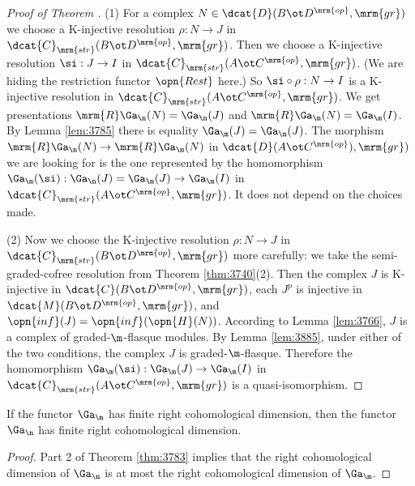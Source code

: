 \begin{proof}[Proof of Theorem \tup{\ref{thm:3783}}] \mbox{}

\smallskip \noindent
(1) For a complex 
$N \in \dcat{D}(B \ot D^{\mrm{op}}, \mrm{gr})$
we choose a K-injective resolution $\rho : N \to J$ in 
$\dcat{C}_{\mrm{str}}(B \ot D^{\mrm{op}}, \mrm{gr})$.
Then we choose a  K-injective resolution $\si : J \to I$ in 
$\dcat{C}_{\mrm{str}}(A \ot C^{\mrm{op}}, \mrm{gr})$. (We are hiding the 
restriction functor $\opn{Rest}$ here.) So 
$\si \circ \rho : N \to I$ is a K-injective resolution 
in $\dcat{C}_{\mrm{str}}(A \ot C^{\mrm{op}}, \mrm{gr})$.
We get presentations 
$\mrm{R} \Ga_{\n}(N) = \Ga_{\n}(J)$ and 
$\mrm{R} \Ga_{\m}(N) = \Ga_{\m}(I)$. 
By Lemma \ref{lem:3785} there is equality 
$\Ga_{\m}(J) = \Ga_{\n}(J)$. 
The morphism $\mrm{R} \Ga_{\n}(N) \to \mrm{R} \Ga_{\m}(N)$
in $\dcat{D}(A \ot C^{\mrm{op}}), \mrm{gr})$
we are looking for is the one represented by the homomorphism 
$\Ga_{\m}(\si) : \Ga_{\n}(J) = \Ga_{\m}(J) \to \Ga_{\m}(I)$
in $\dcat{C}_{\mrm{str}}(A \ot C^{\mrm{op}}, \mrm{gr})$. 
It does not depend on the choices made. 

\medskip \noindent
(2) Now we choose the K-injective resolution $\rho : N \to J$ in 
$\dcat{C}_{\mrm{str}}(B \ot D^{\mrm{op}}, \mrm{gr})$ more carefully: 
we take the semi-graded-cofree resolution from Theorem \ref{thm:3740}(2).
Then the complex $J$ is K-injective in $\dcat{C}(B \ot D^{\mrm{op}}, \mrm{gr})$, 
each $J^p$ is injective in $\dcat{M}(B \ot D^{\mrm{op}}, \mrm{gr})$, and 
$\opn{inf}(J) = \opn{inf}(\opn{H}(N))$. 
According to Lemma \ref{lem:3766}, $J$ is a complex of graded-$\m$-flasque 
modules. By Lemma \ref{lem:3885}, under either of the two conditions, 
the complex $J$ is graded-$\m$-flasque. Therefore the homomorphism 
$\Ga_{\m}(\si) : \Ga_{\m}(J) \to \Ga_{\m}(I)$
in $\dcat{C}_{\mrm{str}}(A \ot C^{\mrm{op}}, \mrm{gr})$ is a quasi-isomorphism. 
\end{proof}

\begin{cor} \label{cor:4030}
If the functor $\Ga_{\m}$ has finite right cohomological dimension, then 
the functor $\Ga_{\n}$ has finite right cohomological dimension.
\end{cor}

\begin{proof}
Part 2 of Theorem \ref{thm:3783} implies that the right cohomological dimension 
of $\Ga_{\n}$ is at most the right cohomological dimension of $\Ga_{\m}$.  
\end{proof}

